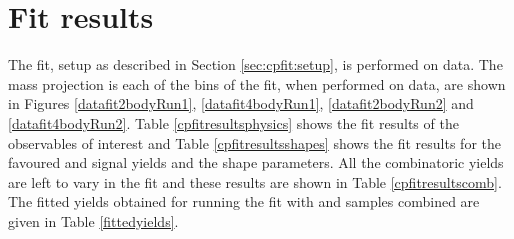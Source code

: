 \section{Fit results}
\label{sec:cpfit:results}

The \CP fit, setup as described in Section \ref{sec:cpfit:setup}, is performed on data. The mass projection is each of the bins of the \CP fit, when performed on data, are shown in Figures \ref{datafit2bodyRun1}, \ref{datafit4bodyRun1}, \ref{datafit2bodyRun2} and \ref{datafit4bodyRun2}. Table \ref{cpfitresultsphysics} shows the \CP fit results of the \CP observables of interest and Table \ref{cpfitresultsshapes} shows the fit results for the favoured \kpi and \kpipipi signal yields and the shape parameters. All the combinatoric yields are left to vary in the \CP fit and these results are shown in Table \ref{cpfitresultscomb}. The fitted yields obtained for running the fit with \Bp and \Bm samples combined are given in Table \ref{fittedyields}. 

